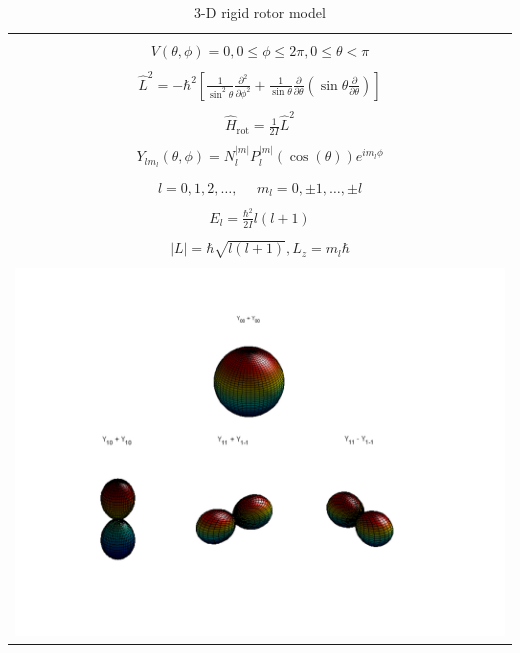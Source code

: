\documentclass[11pt]{article}
\begin{document}
\begin{table}
   \begin{center}
   \caption{3-D rigid rotor model}
    \label{3-D Rigid rotor}
\begin{tabular}[h]{|c|}
\hline
 \\
$\displaystyle       V(\theta,\phi) = 0, 0 \leq \phi \leq 2\pi, 0 \leq \theta <
\pi$ \\
 \\
$\displaystyle     \hat L^2 = -\hbar^2 \left [
  \frac{1}{\sin^2\theta}\frac{\partial^2}{\partial \phi^2}+\frac{1}{\sin
    \theta}\frac{\partial}{\partial \theta}\left ( \sin \theta
    \frac{\partial}{\partial \theta}\right ) \right ] $ \\
\\
$\displaystyle \hat H_\text{rot} = \frac{1}{2 I} \hat L^2$ \\
\\
$\displaystyle     Y_{lm_l}(\theta,\phi)=N_l^{|m|}P_l^{|m|}(\cos(\theta))e^{im_l\phi}$ \\
\\
$\displaystyle l = 0, 1, 2, \ldots, \ \ \ \ \ \ m_l = 0,\pm 1, \ldots, \pm l$
\\
\\
$\displaystyle     E_{l}=\frac{\hbar^2}{2 I}l(l+1)$ \\
 \\
$\displaystyle |L| = \hbar \sqrt{l(l+1)}, L_z = m_l \hbar $ \\
\\
     \includegraphics[scale=0.4]{Images/3Drotor.png} \\       
\hline
\end{tabular}
 \end{center}
\end{table}
\end{document}
